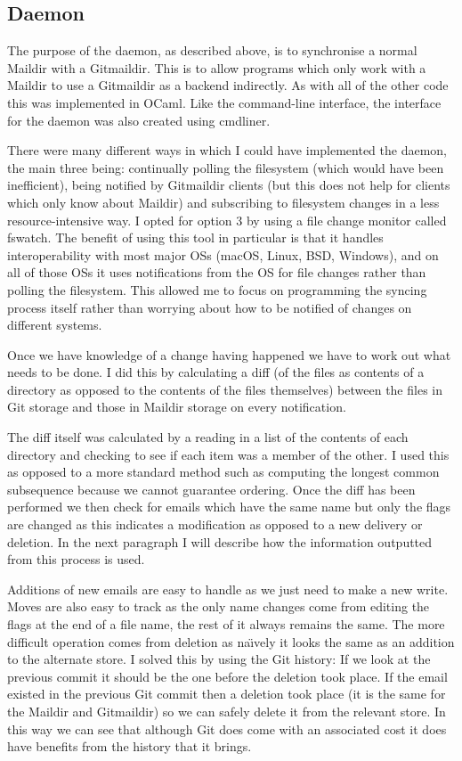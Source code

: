 \subsection{Daemon}

The purpose of the daemon, as described above, is to synchronise a normal Maildir with a Gitmaildir. This is to allow programs which only work with a Maildir to use a Gitmaildir as a backend indirectly. As with all of the other code this was implemented in OCaml. Like the command-line interface, the interface for the daemon was also created using cmdliner.

There were many different ways in which I could have implemented the daemon, the main three being: continually polling the filesystem (which would have been inefficient), being notified by Gitmaildir clients (but this does not help for clients which only know about Maildir) and subscribing to filesystem changes in a less resource-intensive way. I opted for option 3 by using a file change monitor called fswatch\cite{code_fswatch}. The benefit of using this tool in particular is that it handles interoperability with most major OSs (macOS, Linux, BSD, Windows), and on all of those OSs it uses notifications from the OS for file changes rather than polling the filesystem. This allowed me to focus on programming the syncing process itself rather than worrying about how to be notified of changes on different systems.

Once we have knowledge of a change having happened we have to work out what needs to be done. I did this by calculating a diff (of the files as contents of a directory as opposed to the contents of the files themselves) between the files in Git storage and those in Maildir storage on every notification.

The diff itself was calculated by a reading in a list of the contents of each directory and checking to see if each item was a member of the other. I used this as opposed to a more standard method such as computing the longest common subsequence because we cannot guarantee ordering. Once the diff has been performed we then check for emails which have the same name but only the flags are changed as this indicates a modification as opposed to a new delivery or deletion. In the next paragraph I will describe how the information outputted from this process is used.

Additions of new emails are easy to handle as we just need to make a new write. Moves are also easy to track as the only name changes come from editing the flags at the end of a file name, the rest of it always remains the same. The more difficult operation comes from deletion as na\"{\i}vely it looks the same as an addition to the alternate store. I solved this by using the Git history: If we look at the previous commit it should be the one before the deletion took place. If the email existed in the previous Git commit then a deletion took place (it is the same for the Maildir and Gitmaildir) so we can safely delete it from the relevant store. In this way we can see that although Git does come with an associated cost it does have benefits from the history that it brings.

